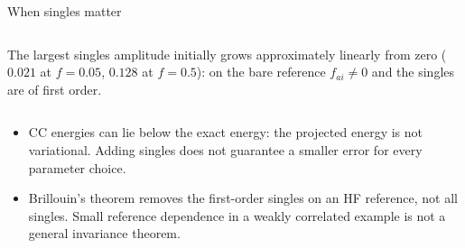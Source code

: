 \documentclass[aspectratio=169,10pt]{beamer}
\begin{document}
\begin{frame}[shrink=16]{When singles matter}
\begin{columns}[T]
\raggedright\footnotesize The largest singles amplitude initially grows approximately linearly from zero ($0.021$ at $f=0.05$, $0.128$ at $f=0.5$): on the bare reference $f_{ai}\ne0$ and the singles are of first order.
\end{columns}
\begin{itemize}
\item CC energies can lie below the exact energy: the projected energy is not variational. Adding singles does not guarantee a smaller error for every parameter choice.
\item Brillouin's theorem removes the first-order singles on an HF reference, not all singles. Small reference dependence in a weakly correlated example is not a general invariance theorem.
\end{itemize}
\end{frame}
\end{document}
